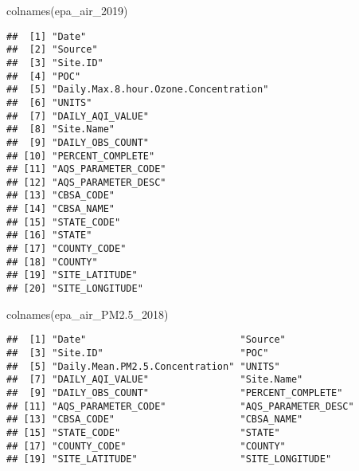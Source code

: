 \documentclass[
]{article}
\newenvironment{Shaded}{\begin{snugshade}}{\end{snugshade}}
\newcommand{\FloatTok}[1]{\textcolor[rgb]{0.00,0.00,0.81}{#1}}
\newcommand{\FunctionTok}[1]{\textcolor[rgb]{0.00,0.00,0.00}{#1}}
\newcommand{\NormalTok}[1]{#1}
\begin{document}
\begin{Shaded}
\begin{Highlighting}[]
\FunctionTok{colnames}\NormalTok{(epa\_air\_2019)}
\end{Highlighting}
\end{Shaded}

\begin{verbatim}
##  [1] "Date"                                
##  [2] "Source"                              
##  [3] "Site.ID"                             
##  [4] "POC"                                 
##  [5] "Daily.Max.8.hour.Ozone.Concentration"
##  [6] "UNITS"                               
##  [7] "DAILY_AQI_VALUE"                     
##  [8] "Site.Name"                           
##  [9] "DAILY_OBS_COUNT"                     
## [10] "PERCENT_COMPLETE"                    
## [11] "AQS_PARAMETER_CODE"                  
## [12] "AQS_PARAMETER_DESC"                  
## [13] "CBSA_CODE"                           
## [14] "CBSA_NAME"                           
## [15] "STATE_CODE"                          
## [16] "STATE"                               
## [17] "COUNTY_CODE"                         
## [18] "COUNTY"                              
## [19] "SITE_LATITUDE"                       
## [20] "SITE_LONGITUDE"
\end{verbatim}

\begin{Shaded}
\begin{Highlighting}[]
\FunctionTok{colnames}\NormalTok{(epa\_air\_PM2}\FloatTok{.5}\NormalTok{\_2018)}
\end{Highlighting}
\end{Shaded}

\begin{verbatim}
##  [1] "Date"                           "Source"                        
##  [3] "Site.ID"                        "POC"                           
##  [5] "Daily.Mean.PM2.5.Concentration" "UNITS"                         
##  [7] "DAILY_AQI_VALUE"                "Site.Name"                     
##  [9] "DAILY_OBS_COUNT"                "PERCENT_COMPLETE"              
## [11] "AQS_PARAMETER_CODE"             "AQS_PARAMETER_DESC"            
## [13] "CBSA_CODE"                      "CBSA_NAME"                     
## [15] "STATE_CODE"                     "STATE"                         
## [17] "COUNTY_CODE"                    "COUNTY"                        
## [19] "SITE_LATITUDE"                  "SITE_LONGITUDE"
\end{verbatim}
\end{document}
